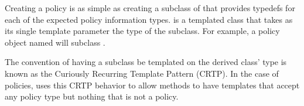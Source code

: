 
Creating a policy is as simple as creating a subclass of  that provides typedefs for each of the expected policy information types.
 is a templated class that takes as its single template parameter the type of the subclass.
For example, a policy object named  will subclass .

\begin{didyouknow}
  The convention of having a subclass be templated on the derived class' type is known as the Curiously Recurring Template Pattern (CRTP).
  In the case of policies, \VTKm uses this CRTP behavior to allow methods to have templates that accept any policy type but nothing that is not a policy.
\end{didyouknow}



